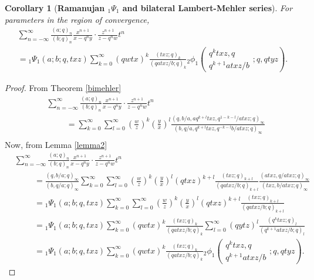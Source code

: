 \documentclass[12pt]{article}
\newtheorem{corollary}{Corollary}
\begin{document}
\begin{corollary}[\bf Ramanujan ${}_{1}\Psi_{1}$ and bilateral Lambert-Mehler series]\label{coroBLM}
For parameters in the region of convergence,
    \begin{multline}
        \sum_{n=-\infty}^{\infty}\frac{(a;q)_n}{(b;q)_n}\frac{x^{n+1}}{x-q^ny}\cdot\frac{z^{n+1}}{z-q^nw}t^n\\
        ={}_{1}\Psi_{1}(a;b;q,txz)\sum_{k=0}^{\infty}\left(qwtx\right)^k\frac{(txz;q)_k}{(qatxz/b;q)_k}{}_{2}\phi_{1}\left(
    \begin{array}{c}
         q^ktxz,q \\
         q^{k+1}atxz/b
    \end{array}
    ;q,qtyz
    \right).
    \end{multline}
\end{corollary}
\begin{proof}
From Theorem \ref{bimehler}
    \begin{align*}
        &\sum_{n=-\infty}^{\infty}\frac{(a;q)_n}{(b;q)_n}\frac{x^{n+1}}{x-q^ny}\cdot\frac{z^{n+1}}{z-q^nw}t^n\\
        &\hspace{1cm}=\sum_{k=0}^{\infty}\sum_{l=0}^{\infty}\left(\frac{w}{z}\right)^k\left(\frac{y}{x}\right)^l\frac{(q,b/a,aq^{k+l}txz,q^{1-k-l}/atxz;q)_{\infty}}{(b,q/a,q^{k+l}txz,q^{-k-l}b/atxz;q)_{\infty}}\\
    \end{align*}
Now, from Lemma \ref{lemma2}
\begin{align*}
    &\sum_{n=-\infty}^{\infty}\frac{(a;q)_n}{(b;q)_n}\frac{x^{n+1}}{x-q^ny}\cdot\frac{z^{n+1}}{z-q^nw}t^n\\
    &\hspace{1cm}=\frac{(q,b/a;q)_\infty}{(b,q/a;q)_\infty}\sum_{k=0}^{\infty}\sum_{l=0}^{\infty}\left(\frac{w}{z}\right)^k\left(\frac{y}{x}\right)^l(qtxz)^{k+l}\frac{(txz;q)_{k+l}}{(qatxz/b;q)_{k+l}}\frac{(atxz,q/atxz;q)_{\infty}}{(txz,b/atxz;q)_{\infty}}\\
        &\hspace{1cm}={}_{1}\Psi_{1}(a;b;q,txz)\sum_{k=0}^{\infty}\sum_{l=0}^{\infty}\left(\frac{w}{z}\right)^k\left(\frac{y}{x}\right)^l(qtxz)^{k+l}\frac{(txz;q)_{k+l}}{(qatxz/b;q)_{k+l}}\\
        &\hspace{1cm}={}_{1}\Psi_{1}(a;b;q,txz)\sum_{k=0}^{\infty}\left(qwtx\right)^k\frac{(txz;q)_k}{(qatxz/b;q)_k}\sum_{l=0}^{\infty}\left(qytz\right)^l\frac{(q^ktxz;q)_{l}}{(q^{k+1}atxz/b;q)_{l}}\\
        &\hspace{1cm}={}_{1}\Psi_{1}(a;b;q,txz)\sum_{k=0}^{\infty}\left(qwtx\right)^k\frac{(txz;q)_k}{(qatxz/b;q)_k}{}_{2}\phi_{1}\left(
    \begin{array}{c}
         q^ktxz,q \\
         q^{k+1}atxz/b
    \end{array}
    ;q,qtyz
    \right).
\end{align*}
\end{proof}
\end{document}
